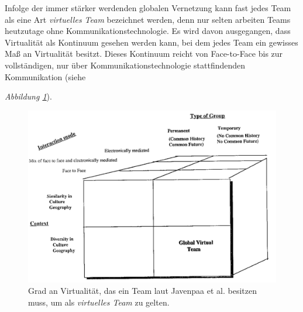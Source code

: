 \documentclass[a4paper,11pt]{article}%
\renewcommand{\\}{\vspace*{0.5\baselineskip} \newline}
\begin{document}
Infolge der immer stärker werdenden globalen Vernetzung kann fast jedes Team als eine Art \textit{virtuelles Team} bezeichnet werden, denn nur selten arbeiten Teams heutzutage ohne Kommunikationstechnologie. 
Es wird davon ausgegangen, dass Virtualität als Kontinuum gesehen werden kann, bei dem jedes Team ein gewisses Maß an Virtualität besitzt. Dieses Kontinuum reicht von Face-to-Face bis zur vollständigen, nur über Kommunikationstechnologie stattfindenden Kommunikation \citep{martins2004virtual} (siehe {\textit{Abbildung \ref{virtualTeamsVirtuality}}).

\begin{figure}[H]
		\begin{footnotesize}
		\centering
			\includegraphics[scale=0.6]{Abbildungen/GlobalVirtualTeam.PNG}	
			\caption[Virtualität eines virtuellen Teams]{Grad an Virtualität, das ein Team laut Javenpaa et al. \citep{jarvenpaa1999communication} besitzen muss, um als \textit{virtuelles Team} zu gelten.}
			\label{virtualTeamsVirtuality}
		\end{footnotesize}
	\end{figure}
%


}
\end{document}
